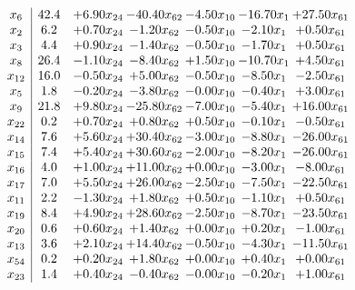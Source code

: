 \documentclass[8pt]{article}
\begin{document}
\[\begin{array}{c| c c@{\hskip 2pt} c@{\hskip 2pt} c@{\hskip 2pt} c@{\hskip 2pt} c@{\hskip 2pt} }
 x_{6}   &  42.4 & +  6.90 x_{24} & -40.40 x_{62} & -4.50 x_{10} & -16.70 x_{1} & + 27.50 x_{61}\\
 x_{2}   &  6.2 & +  0.70 x_{24} & -1.20 x_{62} & -0.50 x_{10} & -2.10 x_{1} & +  0.50 x_{61}\\
 x_{3}   &  4.4 & +  0.90 x_{24} & -1.40 x_{62} & -0.50 x_{10} & -1.70 x_{1} & +  0.50 x_{61}\\
 x_{8}   &  26.4 & -1.10 x_{24} & -8.40 x_{62} & +  1.50 x_{10} & -10.70 x_{1} & +  4.50 x_{61}\\
 x_{12}   &  16.0 & -0.50 x_{24} & +  5.00 x_{62} & -0.50 x_{10} & -8.50 x_{1} & -2.50 x_{61}\\
 x_{5}   &  1.8 & -0.20 x_{24} & -3.80 x_{62} & -0.00 x_{10} & -0.40 x_{1} & +  3.00 x_{61}\\
 x_{9}   &  21.8 & +  9.80 x_{24} & -25.80 x_{62} & -7.00 x_{10} & -5.40 x_{1} & + 16.00 x_{61}\\
 x_{22}   &  0.2 & +  0.70 x_{24} & +  0.80 x_{62} & +  0.50 x_{10} & -0.10 x_{1} & -0.50 x_{61}\\
 x_{14}   &  7.6 & +  5.60 x_{24} & + 30.40 x_{62} & -3.00 x_{10} & -8.80 x_{1} & -26.00 x_{61}\\
 x_{15}   &  7.4 & +  5.40 x_{24} & + 30.60 x_{62} & -2.00 x_{10} & -8.20 x_{1} & -26.00 x_{61}\\
 x_{16}   &  4.0 & +  1.00 x_{24} & + 11.00 x_{62} & +  0.00 x_{10} & -3.00 x_{1} & -8.00 x_{61}\\
 x_{17}   &  7.0 & +  5.50 x_{24} & + 26.00 x_{62} & -2.50 x_{10} & -7.50 x_{1} & -22.50 x_{61}\\
 x_{11}   &  2.2 & -1.30 x_{24} & +  1.80 x_{62} & +  0.50 x_{10} & -1.10 x_{1} & +  0.50 x_{61}\\
 x_{19}   &  8.4 & +  4.90 x_{24} & + 28.60 x_{62} & -2.50 x_{10} & -8.70 x_{1} & -23.50 x_{61}\\
 x_{20}   &  0.6 & +  0.60 x_{24} & +  1.40 x_{62} & +  0.00 x_{10} & +  0.20 x_{1} & -1.00 x_{61}\\
 x_{13}   &  3.6 & +  2.10 x_{24} & + 14.40 x_{62} & -0.50 x_{10} & -4.30 x_{1} & -11.50 x_{61}\\
 x_{54}   &  0.2 & +  0.20 x_{24} & +  1.80 x_{62} & +  0.00 x_{10} & +  0.40 x_{1} & +  0.00 x_{61}\\
 x_{23}   &  1.4 & +  0.40 x_{24} & -0.40 x_{62} & -0.00 x_{10} & -0.20 x_{1} & +  1.00 x_{61}\\

\end{array}\]
\end{document}
